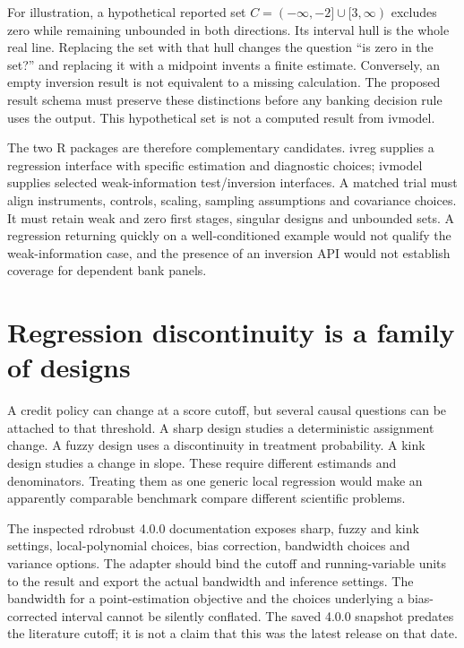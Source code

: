 For illustration, a hypothetical reported set
\(C=(-\infty,-2]\cup[3,\infty)\) excludes zero while remaining unbounded in both
directions. Its interval hull is the whole real line. Replacing the set with
that hull changes the question ``is zero in the set?'' and replacing it with a
midpoint invents a finite estimate. Conversely, an empty inversion result is
not equivalent to a missing calculation. The proposed result schema must
preserve these distinctions before any banking decision rule uses the output.
This hypothetical set is not a computed result from ivmodel.

The two R packages are therefore complementary candidates. ivreg supplies a
regression interface with specific estimation and diagnostic choices; ivmodel
supplies selected weak-information test/inversion interfaces. A matched trial
must align instruments, controls, scaling, sampling assumptions and covariance
choices. It must retain weak and zero first stages, singular designs and
unbounded sets. A regression returning quickly on a well-conditioned example
would not qualify the weak-information case, and the presence of an inversion
API would not establish coverage for dependent bank panels.

\section{Regression discontinuity is a family of designs}

A credit policy can change at a score cutoff, but several causal questions can
be attached to that threshold. A sharp design studies a deterministic assignment
change. A fuzzy design uses a discontinuity in treatment probability. A kink
design studies a change in slope. These require different estimands and
denominators. Treating them as one generic local regression would make an
apparently comparable benchmark compare different scientific problems.

The inspected rdrobust 4.0.0 documentation exposes sharp, fuzzy and kink
settings, local-polynomial choices, bias correction, bandwidth choices and
variance options. The adapter should bind the cutoff and running-variable
units to the result and export the actual bandwidth and inference settings.
The bandwidth for a point-estimation objective and the choices underlying a
bias-corrected interval cannot be silently conflated. The saved 4.0.0 snapshot
predates the literature cutoff; it is not a claim that this was the latest
release on that date.\cite{v12_sw_rdrobust}

